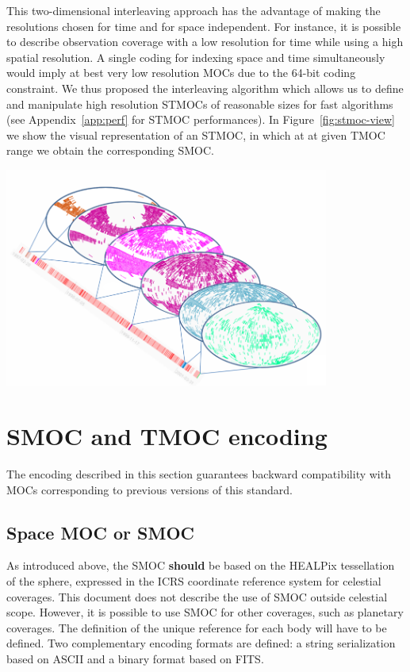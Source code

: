 \documentclass[11pt,a4paper]{ivoa}
\begin{document}
This two-dimensional interleaving approach has the advantage of making
the resolutions chosen for time and for space independent. For
instance, it is possible to describe observation coverage with a low
resolution for time while using a high spatial
resolution.
A single coding for indexing space and time simultaneously would imply
at best very low resolution MOCs due to the 64-bit coding constraint. 
We thus proposed the interleaving algorithm which allows us to define and
manipulate high resolution STMOCs of reasonable sizes for fast algorithms
(see Appendix~\ref{app:perf} for STMOC performances).
In Figure~\ref{fig:stmoc-view} we show the visual representation of an STMOC,
in which at at given TMOC range we obtain the corresponding SMOC. 
 
\begin{adjustbox}{center,caption={STMOC visual representation in which
      at at given TMOC range we obtain the corresponding SMOC},
    label={fig:stmoc-view},nofloat=figure,vspace=\bigskipamount}
\includegraphics[width=0.8\textwidth]{stmoc_view.png}
\end{adjustbox}

\section{SMOC and TMOC encoding}
The encoding described in this section guarantees backward compatibility
with MOCs corresponding to previous versions of this standard.

\subsection{Space MOC or SMOC}
As introduced above, the SMOC {\bf should} be based on the
HEALPix tessellation of the sphere, expressed in the ICRS coordinate
reference system for celestial coverages. This document does not describe
the use of SMOC outside celestial scope. However, it is possible to use
SMOC for other coverages, such as planetary coverages. The definition of
the unique reference for each body will have to be defined. Two complementary
encoding formats are defined: a string serialization based on ASCII and a
binary format based on FITS.
\end{document}
